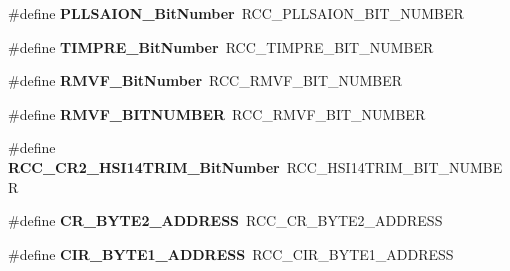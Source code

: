 \begin{DoxyCompactItemize}
\item 
\hypertarget{group___h_a_l___r_c_c___aliased_ga786a15b370532d6429e03a9f9d226be7}{\#define {\bfseries P\-L\-L\-S\-A\-I\-O\-N\-\_\-\-Bit\-Number}~R\-C\-C\-\_\-\-P\-L\-L\-S\-A\-I\-O\-N\-\_\-\-B\-I\-T\-\_\-\-N\-U\-M\-B\-E\-R}\label{group___h_a_l___r_c_c___aliased_ga786a15b370532d6429e03a9f9d226be7}

\item 
\hypertarget{group___h_a_l___r_c_c___aliased_ga3e4d33566ef60a5220ce491e74a34478}{\#define {\bfseries T\-I\-M\-P\-R\-E\-\_\-\-Bit\-Number}~R\-C\-C\-\_\-\-T\-I\-M\-P\-R\-E\-\_\-\-B\-I\-T\-\_\-\-N\-U\-M\-B\-E\-R}\label{group___h_a_l___r_c_c___aliased_ga3e4d33566ef60a5220ce491e74a34478}

\item 
\hypertarget{group___h_a_l___r_c_c___aliased_ga3a0580593374569f2663f1432812f8fe}{\#define {\bfseries R\-M\-V\-F\-\_\-\-Bit\-Number}~R\-C\-C\-\_\-\-R\-M\-V\-F\-\_\-\-B\-I\-T\-\_\-\-N\-U\-M\-B\-E\-R}\label{group___h_a_l___r_c_c___aliased_ga3a0580593374569f2663f1432812f8fe}

\item 
\hypertarget{group___h_a_l___r_c_c___aliased_gad4cc72917b15affc54b4d28e6529634c}{\#define {\bfseries R\-M\-V\-F\-\_\-\-B\-I\-T\-N\-U\-M\-B\-E\-R}~R\-C\-C\-\_\-\-R\-M\-V\-F\-\_\-\-B\-I\-T\-\_\-\-N\-U\-M\-B\-E\-R}\label{group___h_a_l___r_c_c___aliased_gad4cc72917b15affc54b4d28e6529634c}

\item 
\hypertarget{group___h_a_l___r_c_c___aliased_ga407a7f1f6db8025f2e21fbde11d65176}{\#define {\bfseries R\-C\-C\-\_\-\-C\-R2\-\_\-\-H\-S\-I14\-T\-R\-I\-M\-\_\-\-Bit\-Number}~R\-C\-C\-\_\-\-H\-S\-I14\-T\-R\-I\-M\-\_\-\-B\-I\-T\-\_\-\-N\-U\-M\-B\-E\-R}\label{group___h_a_l___r_c_c___aliased_ga407a7f1f6db8025f2e21fbde11d65176}

\item 
\hypertarget{group___h_a_l___r_c_c___aliased_ga0193aa09fc91ebd9a119c8d98e6184a9}{\#define {\bfseries C\-R\-\_\-\-B\-Y\-T\-E2\-\_\-\-A\-D\-D\-R\-E\-S\-S}~R\-C\-C\-\_\-\-C\-R\-\_\-\-B\-Y\-T\-E2\-\_\-\-A\-D\-D\-R\-E\-S\-S}\label{group___h_a_l___r_c_c___aliased_ga0193aa09fc91ebd9a119c8d98e6184a9}

\item 
\hypertarget{group___h_a_l___r_c_c___aliased_ga159aa247b8dc96a030bcb9b43ece4256}{\#define {\bfseries C\-I\-R\-\_\-\-B\-Y\-T\-E1\-\_\-\-A\-D\-D\-R\-E\-S\-S}~R\-C\-C\-\_\-\-C\-I\-R\-\_\-\-B\-Y\-T\-E1\-\_\-\-A\-D\-D\-R\-E\-S\-S}\label{group___h_a_l___r_c_c___aliased_ga159aa247b8dc96a030bcb9b43ece4256}


\end{DoxyCompactItemize}
